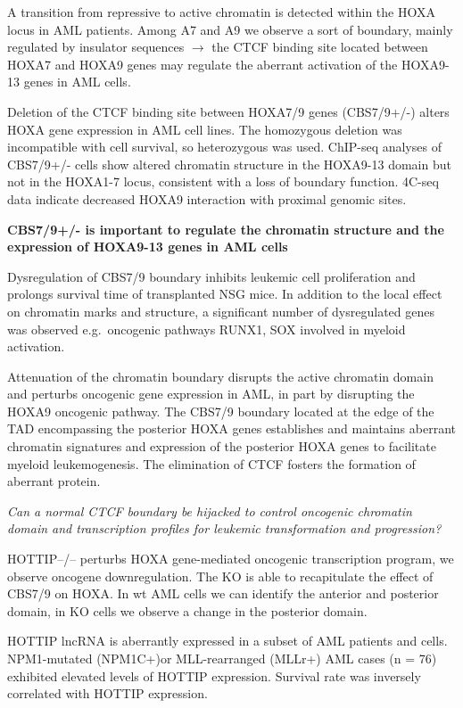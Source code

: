 A transition from repressive to active chromatin is detected within the HOXA locus in AML patients. Among A7 and A9 we observe a sort of boundary, mainly regulated by insulator sequences $\rightarrow$ the CTCF binding site located between HOXA7 and HOXA9 genes may regulate the aberrant activation of the HOXA9-13 genes in AML cells.

Deletion of the CTCF binding site between HOXA7/9 genes (CBS7/9+/-) alters HOXA gene expression in AML cell lines. The homozygous deletion was incompatible with cell survival, so heterozygous was used. ChIP-seq analyses of CBS7/9+/- cells show altered chromatin structure in the HOXA9-13 domain but not in the HOXA1-7 locus, consistent with a loss of boundary function. 4C-seq data indicate decreased HOXA9 interaction with proximal genomic sites.

\textbf{CBS7/9+/- is important to regulate the chromatin structure and the expression of HOXA9-13 genes in AML cells}

Dysregulation of CBS7/9 boundary inhibits leukemic cell proliferation and prolongs survival time of transplanted NSG mice. In addition to the local effect on chromatin marks and structure, a significant number of dysregulated genes was observed e.g.~oncogenic pathways RUNX1, SOX involved in myeloid activation.

Attenuation of the chromatin boundary disrupts the active chromatin domain and perturbs oncogenic gene expression in AML, in part by disrupting the HOXA9 oncogenic pathway. The CBS7/9 boundary located at the edge of the TAD encompassing the posterior HOXA genes establishes and maintains aberrant chromatin signatures and expression of the posterior HOXA genes to facilitate myeloid leukemogenesis. The elimination of CTCF fosters the formation of aberrant protein.

\emph{Can a normal CTCF boundary be hijacked to control oncogenic chromatin domain and transcription profiles for leukemic transformation and progression?}

HOTTIP--/-- perturbs HOXA gene-mediated oncogenic transcription program, we observe oncogene downregulation. The KO is able to recapitulate the effect of CBS7/9 on HOXA. In wt AML cells we can identify the anterior and posterior domain, in KO cells we observe a change in the posterior domain.

HOTTIP lncRNA is aberrantly expressed in a subset of AML patients and cells. NPM1-mutated (NPM1C+)or MLL-rearranged (MLLr+) AML cases (n = 76) exhibited elevated levels of HOTTIP expression. Survival rate was inversely correlated with HOTTIP expression.

